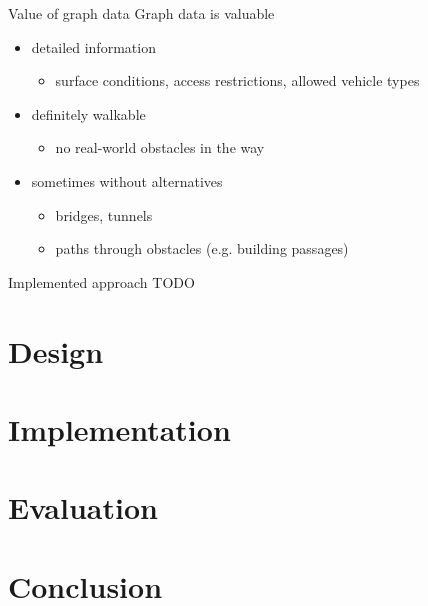 \documentclass{beamer}
\begin{document}
		\begin{frame}{Value of graph data}
			Graph data is valuable\\[3ex]
			\begin{itemize}
				\item detailed information
				\begin{itemize}
					\item surface conditions, access restrictions, allowed vehicle types
				\end{itemize}
				\item definitely walkable
				\begin{itemize}
					\item no real-world obstacles in the way
				\end{itemize}
				\item sometimes without alternatives
				\begin{itemize}
					\item bridges, tunnels
					\item paths through obstacles (e.g. building passages)
				\end{itemize}
			\end{itemize}
		\end{frame}
		
		\begin{frame}{Implemented approach}
			TODO
		\end{frame}
	
	\section{Design}
	
	\section{Implementation}
	
	\section{Evaluation}
	
	\section{Conclusion}
\end{document}

